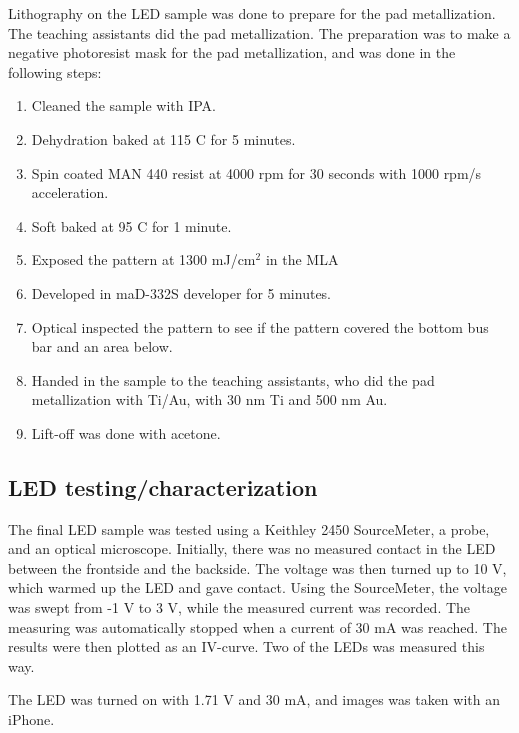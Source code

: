 \noindent Lithography on the LED sample was done to prepare for the pad metallization.
The teaching assistants did the pad metallization.
The preparation was to make a negative photoresist mask for the pad metallization, and was done in the following steps:
\begin{enumerate}
    \item Cleaned the sample with IPA.
    \item Dehydration baked at 115 \textdegree C for 5 minutes.
    \item Spin coated MAN 440 resist at 4000 rpm for 30 seconds with 1000 rpm/s acceleration.
    \item Soft baked at 95 \textdegree C for 1 minute.
    \item Exposed the pattern at 1300 mJ/cm$^2$ in the MLA
    \item Developed in maD-332S developer for 5 minutes.
    \item Optical inspected the pattern to see if the pattern covered the bottom bus bar and an area below.
    \item Handed in the sample to the teaching assistants, who did the pad metallization with Ti/Au, with 30 nm Ti and 500 nm Au.
    \item Lift-off was done with acetone.
\end{enumerate}


\subsection{LED testing/characterization}
\label{methods:LED_testing}

\noindent The final LED sample was tested using a Keithley 2450 SourceMeter, a probe, and an optical microscope.
Initially, there was no measured contact in the LED between the frontside and the backside.
The voltage was then turned up to 10 V, which warmed up the LED and gave contact. 
Using the SourceMeter, the voltage was swept from -1 V to 3 V, while the measured current was recorded.
The measuring was automatically stopped when a current of 30 mA was reached.
The results were then plotted as an IV-curve.
Two of the LEDs was measured this way. 

The LED was turned on with 1.71 V and 30 mA, and images was taken with an iPhone.
